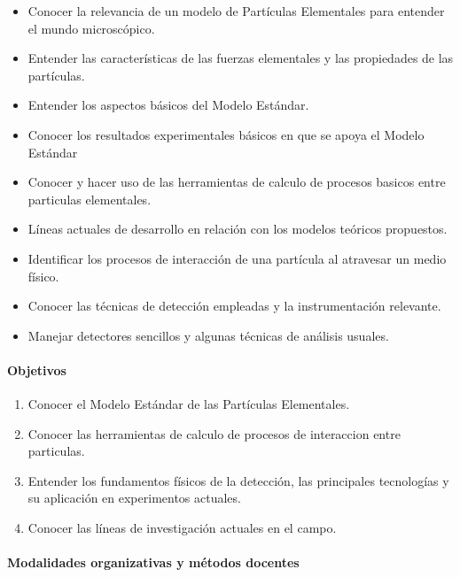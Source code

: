 \begin{itemize}
\item Conocer la relevancia de un modelo de Partículas Elementales para entender el mundo microscópico.
\item Entender las características de las fuerzas elementales y las propiedades de las partículas.
\item Entender los aspectos básicos del Modelo Estándar.
\item Conocer los resultados experimentales básicos en que se apoya el Modelo Estándar
\item Conocer y hacer uso de las herramientas de calculo de procesos basicos entre particulas elementales.
\item Líneas actuales de desarrollo en relación con los modelos teóricos propuestos.
\item Identificar los procesos de interacción de una partícula al atravesar un medio físico.
\item Conocer las técnicas de detección empleadas y la instrumentación relevante.
\item Manejar detectores sencillos y algunas técnicas de análisis usuales.

\end{itemize}

\paragraph{Objetivos}

\begin{enumerate}
\item Conocer el Modelo Estándar de las Partículas Elementales.
\item Conocer las herramientas de calculo de procesos de interaccion entre particulas.
\item Entender los fundamentos físicos de la detección, las principales tecnologías y su aplicación en experimentos actuales.
\item Conocer las líneas de investigación actuales en el campo.
\end{enumerate}

\paragraph{Modalidades organizativas y métodos docentes}

